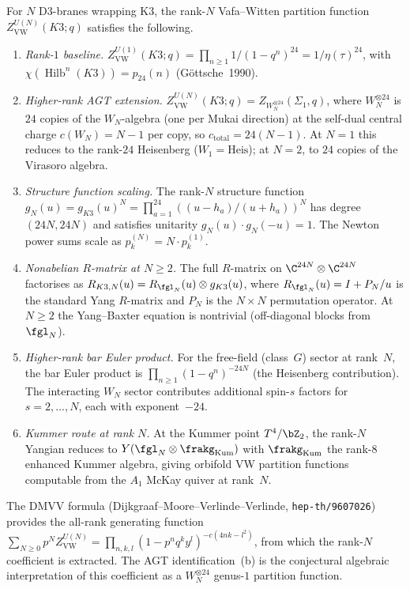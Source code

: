 \begin{conjecture}
\label{conj:k3e-agt-higher-rank}
\ClaimStatusConjectured
For $N$ D3-branes wrapping K3, the rank-$N$ Vafa--Witten partition function
$Z_{\mathrm{VW}}^{U(N)}(K3; q)$ satisfies the following.
\begin{enumerate}[label=\textup{(\alph*)}]
 \item \emph{Rank-$1$ baseline.}
 $Z_{\mathrm{VW}}^{U(1)}(K3; q) = \prod_{n \ge 1} 1/(1 - q^n)^{24}
 = 1/\eta(\tau)^{24}$, with
 $\chi(\operatorname{Hilb}^n(K3)) = p_{24}(n)$ (G\"ottsche~1990).

 \item \emph{Higher-rank AGT extension.}
 $Z_{\mathrm{VW}}^{U(N)}(K3; q) = Z_{W_N^{\otimes 24}}(\Sigma_1, q)$,
 where $W_N^{\otimes 24}$ is $24$ copies of the $W_N$-algebra (one per
 Mukai direction) at the self-dual central charge $c(W_N) = N - 1$
 per copy, so $c_{\mathrm{total}} = 24(N - 1)$. At $N = 1$ this reduces
 to the rank-$24$ Heisenberg ($W_1 = \mathrm{Heis}$); at $N = 2$, to
 $24$ copies of the Virasoro algebra.

 \item \emph{Structure function scaling.}
 The rank-$N$ structure function
 $g_N(u) = g_{K3}(u)^N = \prod_{a=1}^{24}
 ((u - h_a)/(u + h_a))^N$ has degree $(24N, 24N)$
 and satisfies unitarity $g_N(u) \cdot g_N(-u) = 1$.
 The Newton power sums scale as $p_k^{(N)} = N \cdot p_k^{(1)}$.

 \item \emph{Nonabelian $R$-matrix at $N \ge 2$.}
 The full $R$-matrix on $\C^{24N} \otimes \C^{24N}$ factorises as
 $R_{K3,N}(u) = R_{\fgl_N}(u) \otimes g_{K3}(u)$,
 where $R_{\fgl_N}(u) = I + P_N/u$ is the standard Yang $R$-matrix
 and $P_N$ is the $N \times N$ permutation operator. At $N \ge 2$
 the Yang--Baxter equation is nontrivial (off-diagonal blocks from
 $\fgl_N$).

 \item \emph{Higher-rank bar Euler product.}
 For the free-field (class~$G$) sector at rank~$N$, the bar Euler
 product is $\prod_{n \ge 1}(1 - q^n)^{-24N}$ (the Heisenberg
 contribution). The interacting $W_N$ sector contributes additional
 spin-$s$ factors for $s = 2, \ldots, N$, each with exponent~$-24$.

 \item \emph{Kummer route at rank $N$.}
 At the Kummer point $T^4/\bZ_2$, the rank-$N$ Yangian reduces to
 $Y(\fgl_N \otimes \frakg_{\mathrm{Kum}})$ with $\frakg_{\mathrm{Kum}}$
 the rank-$8$ enhanced Kummer algebra, giving orbifold
 VW partition functions computable from the $A_1$ McKay quiver
 at rank~$N$.
\end{enumerate}

The DMVV formula (Dijkgraaf--Moore--Verlinde--Verlinde, \texttt{hep-th/9607026})
provides the all-rank generating function
$\sum_{N \ge 0} p^N Z_{\mathrm{VW}}^{U(N)} =
\prod_{n,k,l}(1 - p^n q^k y^l)^{-c(4nk - l^2)}$, from which
the rank-$N$ coefficient is extracted. The AGT identification~(b)
is the conjectural algebraic interpretation of this coefficient
as a $W_N^{\otimes 24}$ genus-$1$ partition function.
\end{conjecture}
